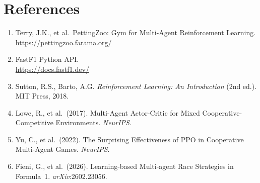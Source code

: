 \documentclass[11pt]{article}
\begin{document}
\section*{References}
{\raggedright
\begin{enumerate}
  \setlength{\itemsep}{4pt}
    \item Terry, J.K., et al.\ PettingZoo: Gym for Multi-Agent Reinforcement Learning.
    \\\url{https://pettingzoo.farama.org/}
    \item FastF1 Python API.\\\url{https://docs.fastf1.dev/}
    \item Sutton, R.S., Barto, A.G. \textit{Reinforcement Learning: An Introduction}
    (2nd ed.). MIT Press, 2018.
    \item Lowe, R., et al.\ (2017). Multi-Agent Actor-Critic for Mixed
    Cooperative-Competitive Environments. \textit{NeurIPS}.
    \item Yu, C., et al.\ (2022). The Surprising Effectiveness of PPO in Cooperative
    Multi-Agent Games. \textit{NeurIPS}.
    \item Fieni, G., et al.\ (2026). Learning-based Multi-agent Race Strategies in
    Formula~1. \textit{arXiv}:2602.23056.
\end{enumerate}
}
\end{document}
